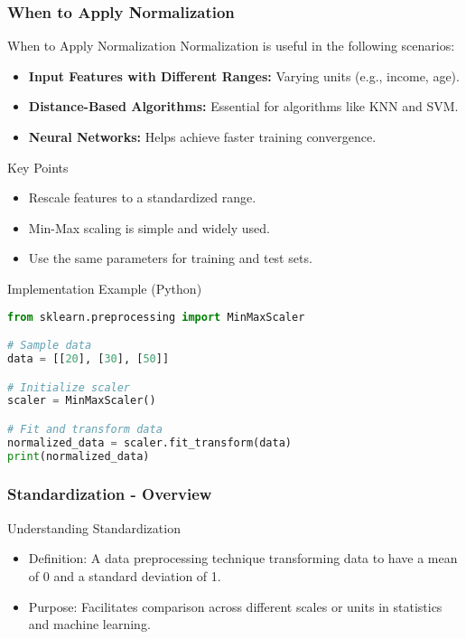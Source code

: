 \documentclass[aspectratio=169]{beamer}
\begin{document}
\begin{frame}[fragile]
    \frametitle{When to Apply Normalization}
    \begin{block}{When to Apply Normalization}
        Normalization is useful in the following scenarios:
        \begin{itemize}
            \item \textbf{Input Features with Different Ranges:} Varying units (e.g., income, age).
            \item \textbf{Distance-Based Algorithms:} Essential for algorithms like KNN and SVM.
            \item \textbf{Neural Networks:} Helps achieve faster training convergence.
        \end{itemize}
    \end{block}

    \begin{block}{Key Points}
        \begin{itemize}
            \item Rescale features to a standardized range.
            \item Min-Max scaling is simple and widely used.
            \item Use the same parameters for training and test sets.
        \end{itemize}
    \end{block}
    
    \begin{block}{Implementation Example (Python)}
        \begin{lstlisting}[language=Python]
from sklearn.preprocessing import MinMaxScaler

# Sample data
data = [[20], [30], [50]]

# Initialize scaler
scaler = MinMaxScaler()

# Fit and transform data
normalized_data = scaler.fit_transform(data)
print(normalized_data)
        \end{lstlisting}
    \end{block}
\end{frame}

\begin{frame}[fragile]
    \frametitle{Standardization - Overview}
    \begin{block}{Understanding Standardization}
        \begin{itemize}
            \item Definition: A data preprocessing technique transforming data to have a mean of 0 and a standard deviation of 1.
            \item Purpose: Facilitates comparison across different scales or units in statistics and machine learning.
        \end{itemize}
    \end{block}
\end{frame}
\end{document}
